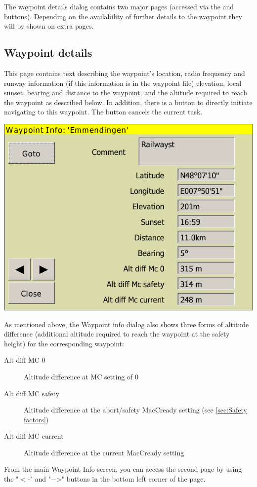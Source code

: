 The waypoint details dialog contains two major pages (accessed via the
\button{$>$} and \button{$<$} buttons). Depending on the availability of further
details to the waypoint they will by shown on extra pages.

\subsection*{Waypoint details}
This page contains text describing the waypoint's location, radio frequency and runway information (if this information is in the waypoint file) elevation, local sunset, bearing and distance to the waypoint, and the altitude required to reach the waypoint as described below. In addition, there is a button  to directly initiate
navigating to this waypoint. The button cancels the current task. 
\begin{center}
\includegraphics[angle=0,width=0.8\linewidth,keepaspectratio='true']{figures/dialog-waypointdetails0.png}
\end{center}

As mentioned above, the Waypoint info dialog also shows three forms of altitude difference (additional
altitude required to reach the waypoint at the safety height) for
the corresponding waypoint:
\begin{description}
\item[Alt diff MC 0] Altitude difference at MC setting of 0
\item[Alt diff MC safety] Altitude difference at the abort/safety MacCready setting (see \ref{sec:Safety factors})
\item[Alt diff MC current] Altitude difference at the current MacCready setting
\end{description}

From the main Waypoint Info screen, you can access the second page by using the "$<$-" and "$-$>" buttons in the bottom left corner of the page.
